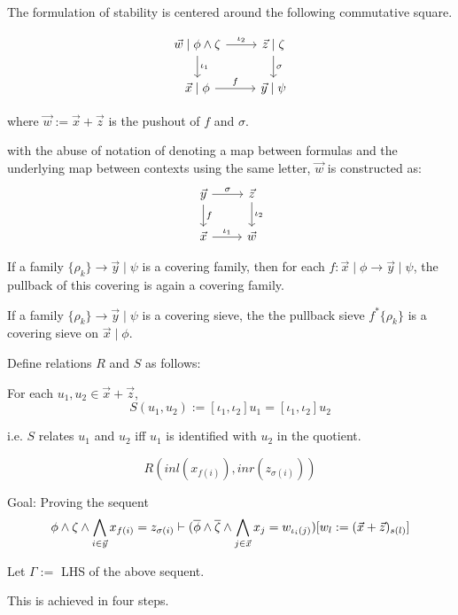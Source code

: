 The formulation of stability is centered around the following commutative square.

\[
\begin{tikzcd}
   \vec{w}\mid \phi\land \zeta \ar[r,"\iota_2"]\ar[d,"\iota_1"]  & \vec{z}\mid \zeta\ar[d,"\sigma"]\\
   \vec{x}\mid \phi \ar[r,"f"] & \vec{y}\mid \psi
\end{tikzcd}
\]

where $\vec{w}:= \vec{x}+ \vec{z}$ is the pushout of $f$ and $\sigma$.

with the abuse of notation of denoting a map between formulas and the underlying map between contexts using the same letter, $\vec{w}$ is constructed as:
\[
\begin{tikzcd}
 \vec{y}\ar[d,"f"]\ar[r,"\sigma"] & \vec{z}\ar[d,"\iota_2"]\\
 \vec{x}\ar[r,"\iota_1"] & \vec{w}
\end{tikzcd}
\]


\begin{lemma}
  If a family $\{\rho_k\}\to \vec{y}\mid \psi$ is a covering family, then for each $f: \vec{x}\mid \phi\to \vec{y}\mid\psi$, the pullback of this covering is again a covering family.
\end{lemma}

\begin{theorem}
  If a family $\{\rho_k\}\to \vec{y}\mid \psi$ is a covering sieve, the the pullback sieve $f^*\{\rho_k\}$ is a covering sieve on $\vec{x}\mid\phi$.

\end{theorem}



Define relations $R$ and $S$ as follows:

For each $u_1,u_2\in \vec{x}+\vec{z}$,
\[S(u_1,u_2):= [\iota_1,\iota_2]u_1 =  [\iota_1,\iota_2]u_2\]

i.e. $S$ relates $u_1$ and $u_2$ iff $u_1$ is identified with $u_2$ in the quotient.

\[R(inl(x_{f(i)}),inr(z_{\sigma(i)}))\]

Goal: Proving the sequent
\[\phi\land \zeta\land \bigwedge_{i\in \vec{y}} x_{f(i)} = z_{\sigma(i)}\vdash (\overline{\phi}\land \overline{\zeta}\land\bigwedge_{j\in\vec{x}} x_j = w_{\iota_i(j)})[w_l:=(\vec{x}+\vec{z})_{s(l)}] \]

Let $\Gamma :=$ LHS of the above sequent.

This is achieved in four steps.

